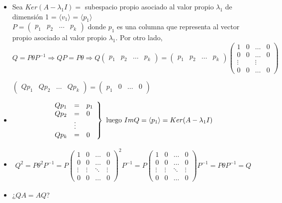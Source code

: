 \documentclass[11pt, a4paper]{article}
\makeatletter
\newif\IfInSansMode
\let\oldsf\sffamily
\renewcommand*{\sffamily}{\oldsf\mathversion{sans}\InSansModetrue}
\let\oldnorm\normalfont
\renewcommand*{\normalfont}{\oldnorm\InSansModefalse\mathversion{normal}}
\renewenvironment{proof}[1][\proofname] {\vspace{-15pt}\par\pushQED{\qed}\normalfont\topsep6\p@\@plus6\p@\relax\trivlist\item[\hskip\labelsep\it#1\@addpunct{.}]\ignorespaces}{\popQED\endtrivlist\@endpefalse}
\numberwithin{equation}{section}
\renewenvironment{proof}[1][\proofname] {\par\pushQED{\qed}\normalfont\topsep6\p@\@plus6\p@\relax\trivlist\item[\hskip\labelsep\itshape\sffamily#1\@addpunct{.}]\ignorespaces}{\popQED\endtrivlist\@endpefalse}
\theoremstyle{theorem-style}
\theoremstyle{definition-style}
\theoremstyle{remark-style}
\theoremstyle{example-style}
\makeatother
\begin{document}
\begin{proof}
    \begin{itemize}
        \item Sea $Ker(A - \lambda_1I) =$ subespacio propio asociado al valor propio $\lambda_1$ de dimensión 1 = $\langle v_1 \rangle$ = $\langle p_1 \rangle$ \\
            $P = \begin{pmatrix}
                p_1 & p_2 & \hdots & p_k
            \end{pmatrix}$ donde $p_1$ es una columna que representa al vector propio asociado al valor propio $\lambda_1$.
            Por otro lado, $Q = P\theta P^{-1} \Rightarrow QP = P\theta \Rightarrow Q \begin{pmatrix}
                p_1 & p_2 & \hdots & p_k
            \end{pmatrix} = \begin{pmatrix}
                p_1 & p_2 & \hdots & p_k
            \end{pmatrix} \begin{pmatrix}
        1 & 0 & \hdots & 0 \\
        0 & 0 & \hdots & 0 \\
        \vdots & & \vdots & \\
        0 & 0 & \hdots & 0
    \end{pmatrix}$

    $ \begin{pmatrix}
        Qp_1 & Qp_2 & \hdots & Qp_k
    \end{pmatrix} = \begin{pmatrix}
        p_1 & 0 & \hdots & 0
    \end{pmatrix}$

\item
    $$ \left.\begin{array}{l l l}
        Qp_1 & = & p_1 \\
        Qp_2 & = & 0 \\
         & \vdots & \\
        Qp_k & = & 0
    \end{array}\right\} \text{ luego } Im Q = \langle p_1 \rangle = Ker (A - \lambda_1 I)$$
\item
    \begin{align*}
        \label{}
        Q^2 = P\theta^2 P^{-1} = P \begin{pmatrix}
            1 & 0 & \hdots & 0 \\
            0 & 0 & \hdots & 0 \\
            \vdots & \vdots & \ddots & \vdots \\
            0 & 0 & \hdots & 0
        \end{pmatrix}^2 P^{-1} = P \begin{pmatrix}
            1 & 0 & \hdots & 0 \\
            0 & 0 & \hdots & 0 \\
            \vdots & \vdots & \ddots & \vdots \\
            0 & 0 & \hdots & 0
        \end{pmatrix}P^{-1} = P\theta P^{-1} = Q
    \end{align*}
\item 
    ¿$QA = AQ$?


\end{itemize}
\end{proof}
\end{document}
